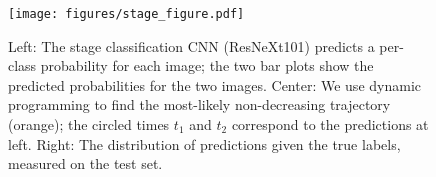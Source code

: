 
\begin{figure}
\texttt{[image: figures/stage\_figure.pdf]}
\caption{
    Left: The stage classification CNN (ResNeXt101) predicts a per-class
    probability for each image; the two bar plots show the predicted
    probabilities for the two images. Center: We use dynamic
    programming to find the most-likely non-decreasing trajectory
    (orange); the circled times $t_1$ and $t_2$ correspond to the
    predictions at left. Right: The distribution of predictions given
    the true labels, measured on the test set.
}
\label{fig:stage}
\end{figure}


